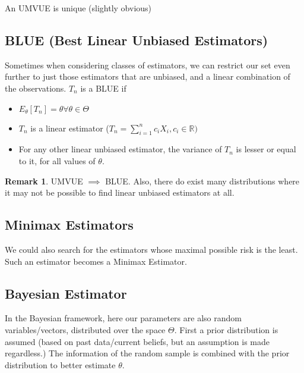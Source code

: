 \documentclass[12pt]{book}
\theoremstyle{definition}
\newtheorem*{remark}{Remark}
\begin{document}
An UMVUE is unique (slightly obvious)

\subsection{BLUE (Best Linear Unbiased Estimators)}
Sometimes when considering classes of estimators, we can restrict our set even further to just those estimators that are unbiased, and a linear combination of the observations. $T_n$ is a BLUE if \begin{itemize}
    \item $E_{\theta}[T_n] = \theta \forall \theta \in \Theta$
    \item $T_n$ is a linear estimator ($T_n = \sum_{i = 1}^n c_iX_i, c_i \in \mathbb{R})$
    \item For any other linear unbiased estimator, the variance of $T_n$ is lesser or equal to it, for all values of $\theta$.
\end{itemize}
\begin{remark}
    UMVUE $\implies$ BLUE. Also, there do exist many distributions where it may not be possible to find linear unbiased estimators at all. 
\end{remark}
\subsection{Minimax Estimators}
We could also search for the estimators whose maximal possible risk is the least. Such an estimator becomes a Minimax Estimator.
\subsection{Bayesian Estimator}
In the Bayesian framework, here our parameters are also random variables/vectors, distributed over the space $\Theta$. First a prior distribution is assumed (based on past data/current beliefs, but an assumption is made regardless.) The information of the random sample is combined with the prior distribution to better estimate $\theta$.
\end{document}

